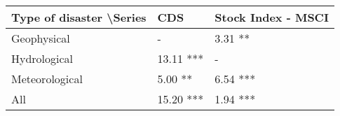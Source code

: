\begin{tabular}{lll}
\toprule
Type of disaster \textbackslash Series & CDS & Stock Index - MSCI \\ \midrule
Geophysical & - & 3.31 ** \\
Hydrological & 13.11 *** & - \\
Meteorological & 5.00 ** & 6.54 *** \\
All & 15.20 *** & 1.94 *** \\ \bottomrule
\end{tabular}